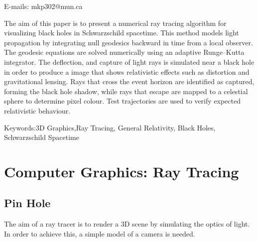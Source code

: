 \documentclass[11pt,a4paper,fleqn]{article}
\begin{document}
\par{}

\vspace{6mm}\par{}

\vspace{6mm}\par{}

\vspace{6mm}\par\noindent
E-mails:
mkp302@mun.ca

\vspace{9mm}\par\noindent\hspace*{8mm}\parbox{140mm}{\small{}
The aim of this paper is to present a numerical ray tracing algorithm for visualizing black holes in Schwarzschild spacetime. This method models light propagation by integrating null geodesics backward in time from a local observer. The geodesic equations are solved numerically using an adaptive Runge–Kutta integrator. The deflection, and capture of light rays is simulated near a black hole in order to produce a image that shows relativistic effects such as distortion and gravitational lensing. Rays that cross the event horizon are identified as captured, forming the black hole shadow, while rays that escape are mapped to a celestial sphere to determine pixel colour. Test trajectories are used to verify expected relativistic behaviour. 
}\par\vspace{5mm}


Keywords:3D Graphics,Ray Tracing, General Relativity, Black Holes, Schwarzschild Spacetime


\section{Computer Graphics: Ray Tracing}
\subsection{Pin Hole}
The aim of a ray tracer is to render a 3D scene by simulating the optics of light. In order to achieve this, a simple model of a camera is needed.
\end{document}

